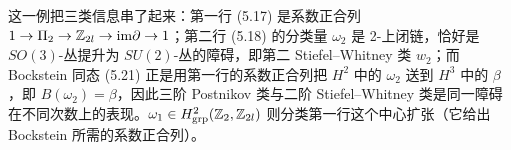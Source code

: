 \begin{yizhu}这一例把三类信息串了起来：第一行 (5.17) 是系数正合列 $1\to\Pi_2\to{\mathbb{Z}}_{2l}\to{\rm im}\partial\to1$；第二行 (5.18) 的分类量 $\omega_2$ 是 2-上闭链，恰好是 $SO(3)$-丛提升为 $SU(2)$-丛的障碍，即第二 Stiefel–Whitney 类 $w_2$；而 Bockstein 同态 (5.21) 正是用第一行的系数正合列把 $H^2$ 中的 $\omega_2$ 送到 $H^3$ 中的 $\beta$，即 $B(\omega_2)=\beta$，因此三阶 Postnikov 类与二阶 Stiefel–Whitney 类是同一障碍在不同次数上的表现。$\omega_1\in H^2_{\rm grp}({\mathbb{Z}}_2,{\mathbb{Z}}_{2l})$ 则分类第一行这个中心扩张（它给出 Bockstein 所需的系数正合列）。\end{yizhu}
